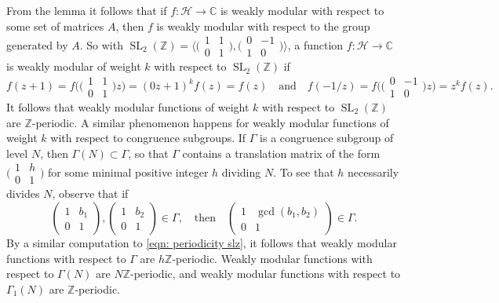 \documentclass[10pt,leqno,twoside,b5paper]{article}
\theoremstyle{plain}
\theoremstyle{definition}
\numberwithin{equation}{section}
\numberwithin{lem}{section}
\DeclareMathOperator{\SL}{SL}
\newcommand{\slz}{\SL_2(\mathbb{Z})}
\begin{document}
From the lemma it follows that if $f\colon \mathcal H\to\mathbb C$ is weakly modular with respect to some set of matrices $A$, then $f$ is weakly modular with respect to the group generated by $A$. So with $\slz = \big\langle\big(\!\begin{smallmatrix}
    1 & 1 \\ 0 & 1
\end{smallmatrix}\!\big), \big(\!\begin{smallmatrix}
    0 & -1 \\ 1 & 0
\end{smallmatrix}\!\big)\big\rangle$, a function $f\colon \mathcal H\to \mathbb C$ is weakly modular of weight $k$ with respect to $\slz$ if
\begin{equation}\label{eqn: periodicity slz}
    f(z+1) = f\big(\big(\!\begin{smallmatrix}
        1 & 1 \\ 0 & 1
    \end{smallmatrix}\!\big)z\big) = (0z+1)^kf(z) = f(z)\quad\text{and}\quad f(-1/z) = f\big(\big(\!\begin{smallmatrix}
        0 & -1 \\ 1 & 0
    \end{smallmatrix}\!\big)z\big) = z^kf(z).
\end{equation} It follows that weakly modular functions of weight $k$ with respect to $\slz$ are $\mathbb Z$-periodic. A similar phenomenon happens for weakly modular functions of weight $k$ with respect to congruence subgroups. If $\varGamma$ is a congruence subgroup of level $N$, then $\varGamma(N)\subset \varGamma$, so that $\varGamma$ contains a translation matrix of the form $\big(\!\begin{smallmatrix}
    1 & h \\ 0 & 1
\end{smallmatrix}\!\big)$ for some minimal positive integer $h$ dividing $N$. To see that $h$ necessarily divides $N$, observe that if 
\[\begin{pmatrix}
    1 & b_1 \\ 0 & 1
\end{pmatrix},\begin{pmatrix}
    1 & b_2 \\ 0 & 1
\end{pmatrix}\in\varGamma, \quad \text{then}\quad \begin{pmatrix}
    1 & \gcd(b_1,b_2) \\ 0 & 1
\end{pmatrix}\in \varGamma.\]
By a similar computation to \cref{eqn: periodicity slz}, it follows that weakly modular functions with respect to $\varGamma$ are $h\mathbb Z$-periodic. Weakly modular functions with respect to $\varGamma(N)$ are $N\mathbb{Z}$-periodic, and weakly modular functions with respect to $\varGamma_1(N)$ are $\mathbb Z$-periodic.
\end{document}

